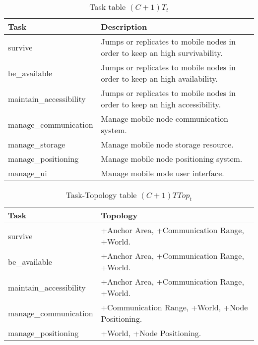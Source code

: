 \begin{table}[H]
	\centering
	\begin{tabular}{|p{5cm}|p{7cm}|}
			\hline
			\textbf{Task} & \textbf{Description} \\
			\hline
			survive & Jumps or replicates to mobile nodes in order to keep an high
			survivability. \\
			\hline
			be\_available & Jumps or replicates to mobile nodes in order to keep an
			high availability. \\
			\hline
			maintain\_accessibility & Jumps or replicates to mobile nodes in order to
			keep an high accessibility. \\
			\hline
			manage\_communication & Manage mobile node communication system. \\
			\hline
			manage\_storage & Manage mobile node storage resource. \\
			\hline
			manage\_positioning & Manage mobile node positioning system. \\
			\hline
			manage\_ui & Manage mobile node user interface. \\
			\hline
		\end{tabular}
	\caption{Task table $(C+1)T_t$}
	\label{tab:cp1tt}
\end{table}

\begin{table}[H]
	\centering
	\begin{tabular}{|p{4cm}|p{8cm}|}
			\hline
			\textbf{Task} & \textbf{Topology} \\
			\hline
			survive & +Anchor Area, +Communication Range, +World. \\
			\hline
			be\_available & +Anchor Area, +Communication Range, +World. \\
			\hline
			maintain\_accessibility & +Anchor Area, +Communication Range, +World. \\
			\hline
			manage\_communication & +Communication Range, +World, +Node Positioning. \\
			\hline
			manage\_positioning & +World, +Node Positioning. \\
			\hline
		\end{tabular}
		\caption{Task-Topology table $(C+1)TTop_t$}
	\label{tab:cp1ttopt}
\end{table}

